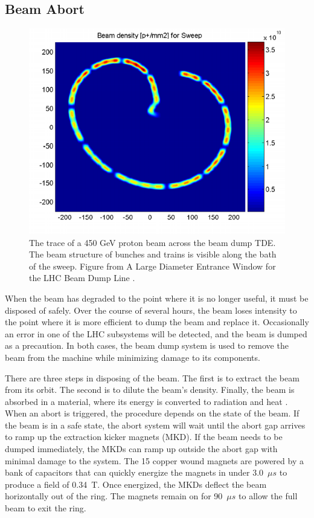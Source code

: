 \subsection{Beam Abort}

\begin{figure}[h!]
\captionsetup[subfigure]{position=b}
\centering
\includegraphics[scale=0.5]{figures/experiment/beamdump.png}
\caption{The trace of a 450 GeV proton beam across the beam dump TDE. The beam structure of bunches and trains is visible along the bath of the sweep. Figure from A Large Diameter Entrance Window for the LHC Beam Dump Line \cite{beamdump}.}
\label{fig:beamdump}
\end{figure}

When the beam has degraded to the point where it is no longer useful, it must be disposed of safely.
Over the course of several hours, the beam loses intensity to the point where it is more efficient to dump the beam and replace it.
Occasionally an error in one of the LHC subsystems will be detected, and the beam is dumped as a precaution.
In both cases, the beam dump system is used to remove the beam from the machine while minimizing damage to its components.

There are three steps in disposing of the beam. 
The first is to extract the beam from its orbit.
The second is to dilute the beam's density.
Finally, the beam is absorbed in a material, where its energy is converted to radiation and heat \cite{lhcDesignV1}.
When an abort is triggered, the procedure depends on the state of the beam.
If the beam is in a safe state, the abort system will wait until the abort gap arrives to ramp up the extraction kicker magnets (MKD).
If the beam needs to be dumped immediately, the MKDs can ramp up outside the abort gap with minimal damage to the system.
The 15 copper wound magnets are powered by a bank of capacitors that can quickly energize the magnets in under 3.0~$\mu s$ to produce a field of 0.34~T. 
Once energized, the MKDs deflect the beam horizontally out of the ring.
The magnets remain on for 90~$\mu s$ to allow the full beam to exit the ring.

